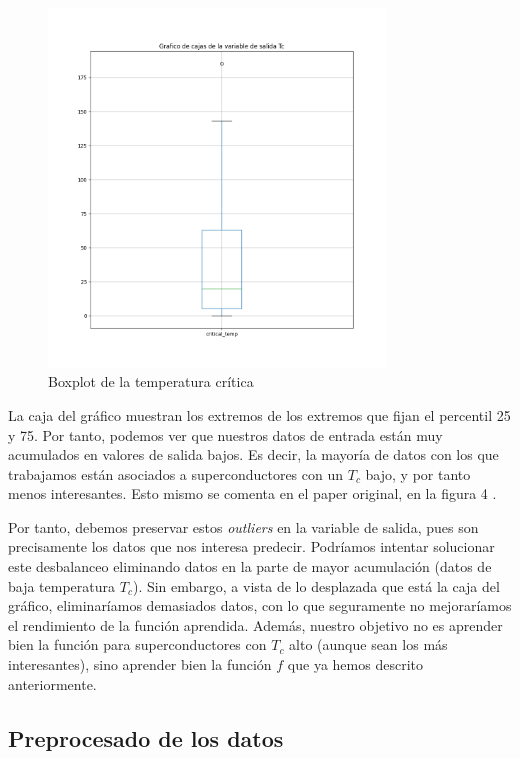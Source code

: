 \documentclass[11pt]{article}
\begin{document}
\begin{figure}[H]
    \centering
    \includegraphics[width=0.8\textwidth]{output_var_boxplot}
    \caption{Boxplot de la temperatura crítica}
\end{figure}

La caja del gráfico muestran los extremos de los extremos que fijan el percentil 25 y 75. Por tanto, podemos ver que nuestros datos de entrada están muy acumulados en valores de salida bajos. Es decir, la mayoría de datos con los que trabajamos están asociados a superconductores con un $T_c$ bajo, y por tanto menos interesantes. Esto mismo se comenta en el paper original, en la figura 4 \cite{original_paper_reg:paper}.

Por tanto, debemos preservar estos \emph{outliers} en la variable de salida, pues son precisamente los datos que nos interesa predecir. Podríamos intentar solucionar este desbalanceo eliminando datos en la parte de mayor acumulación (datos de baja temperatura $T_c$). Sin embargo, a vista de lo desplazada que está la caja del gráfico, eliminaríamos demasiados datos, con lo que seguramente no mejoraríamos el rendimiento de la función aprendida. Además, nuestro objetivo no es aprender bien la función para superconductores con $T_c$ alto (aunque sean los más interesantes), sino aprender bien la función $f$ que ya hemos descrito anteriormente.

\pagebreak
\subsection{Preprocesado de los datos}
\end{document}

